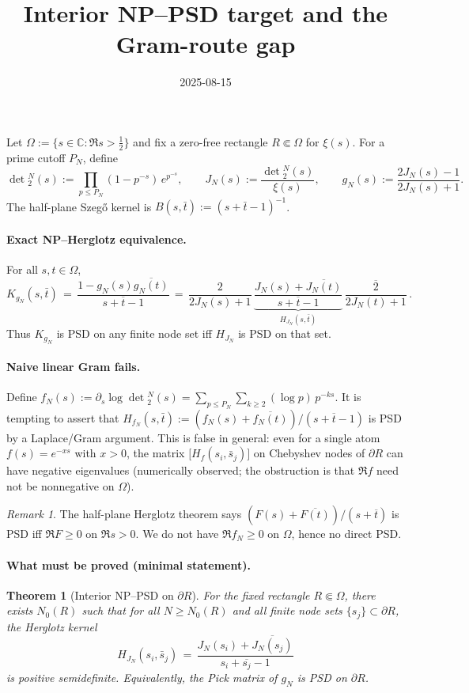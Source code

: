 \documentclass[11pt]{article}
\title{Interior NP--PSD target and the Gram-route gap}
\date{2025-08-15}
\newtheorem{theorem}{Theorem}
\theoremstyle{remark}
\newtheorem{remark}{Remark}
\begin{document}
\maketitle

Let $\Omega := \{ s\in\mathbb C : \Re s > \tfrac12 \}$ and fix a zero-free rectangle $R \Subset \Omega$ for $\xi(s)$. For a prime cutoff $P_N$, define
\[\det{}_2^N(s) := \prod_{p\le P_N} (1-p^{-s})\,e^{p^{-s}},\qquad J_N(s):= \frac{\det{}_2^N(s)}{\xi(s)},\qquad g_N(s):=\frac{2J_N(s)-1}{2J_N(s)+1}.\]
The half-plane Szeg\H{o} kernel is $B(s,\bar t):= (s+\bar t -1)^{-1}$.

\paragraph{Exact NP--Herglotz equivalence.} For all $s,t\in\Omega$,
\begin{equation}\label{eq:NP-factor}
 K_{g_N}(s,\bar t) 
 \,=\, \frac{1-g_N(s)\overline{g_N(t)}}{s+\overline t -1}
 \,=\, \frac{2}{2J_N(s)+1}\,\underbrace{\frac{J_N(s)+\overline{J_N(t)}}{s+\overline t -1}}_{H_{J_N}(s,\bar t)}\,\overline{\frac{2}{2J_N(t)+1}}\,.
\end{equation}
Thus $K_{g_N}$ is PSD on any finite node set iff $H_{J_N}$ is PSD on that set.

\paragraph{Naive linear Gram fails.} Define $f_N(s):= \partial_s \log \det{}_2^N(s) 
 = \sum_{p\le P_N}\sum_{k\ge 2} (\log p)\,p^{-ks}$.
It is tempting to assert that $H_{f_N}(s,\bar t):= (f_N(s)+\overline{f_N(t)})/(s+\overline t-1)$ is PSD by a Laplace/Gram argument. This is false in general: even for a single atom $f(s)=e^{-xs}$ with $x>0$, the matrix $\big[H_f(s_i,\bar s_j)\big]$ on Chebyshev nodes of $\partial R$ can have negative eigenvalues (numerically observed; the obstruction is that $\Re f$ need not be nonnegative on $\Omega$).

\begin{remark}
The half-plane Herglotz theorem says $(F(s)+\overline{F(t)})/(s+\overline t)$ is PSD iff $\Re F\ge 0$ on $\Re s>0$. We do not have $\Re f_N\ge 0$ on $\Omega$, hence no direct PSD.
\end{remark}

\paragraph{What must be proved (minimal statement).}
\begin{theorem}[Interior NP--PSD on $\partial R$]\label{thm:NP-PSD}
For the fixed rectangle $R\Subset\Omega$, there exists $N_0(R)$ such that for all $N\ge N_0(R)$ and all finite node sets $\{s_j\}\subset \partial R$, the Herglotz kernel
\[ H_{J_N}(s_i,\bar s_j) \,=\, \frac{J_N(s_i)+\overline{J_N(s_j)}}{s_i+\overline{s_j}-1} \]
is positive semidefinite.
Equivalently, the Pick matrix of $g_N$ is PSD on $\partial R$.
\end{theorem}
\end{document}
